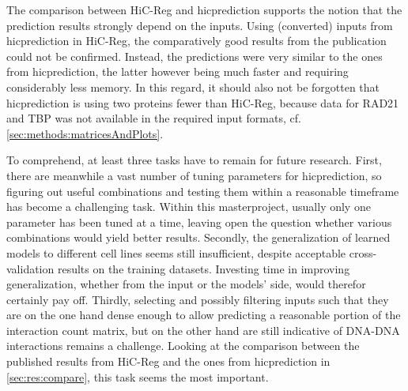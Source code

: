 The comparison between HiC-Reg and hicprediction supports the notion 
that the prediction results strongly depend on the inputs.
Using (converted) inputs from hicprediction in HiC-Reg, 
the comparatively good results from the publication \cite{Zhang2019} could not be confirmed.
Instead, the predictions were very similar to the ones from hicprediction,
the latter however being much faster and requiring considerably less memory.
In this regard, it should also not be forgotten that hicprediction
is using two proteins fewer than HiC-Reg, because data for RAD21
and TBP was not available in the required input formats, cf.\;\autoref{sec:methods:matricesAndPlots}.

To comprehend, at least three tasks have to remain for future research.
First, there are meanwhile a vast number of tuning parameters for hicprediction,
so figuring out useful combinations and testing them within
a reasonable timeframe has become a challenging task. 
Within this masterproject, usually only one parameter has been tuned at a time, 
leaving open the question whether various combinations would yield better results.
Secondly, the generalization of learned models to different cell lines seems still insufficient,
despite acceptable cross-validation results on the training datasets.
Investing time in improving generalization, whether from the input or the models' side,
would therefor certainly pay off.
Thirdly, selecting and possibly filtering inputs such that they are on the one hand dense enough 
to allow predicting a reasonable portion of the interaction count matrix,
but on the other hand are still indicative of DNA-DNA interactions remains a challenge.
Looking at the comparison between the published results from HiC-Reg and the ones from hicprediction
in \autoref{sec:res:compare}, this task seems the most important.





